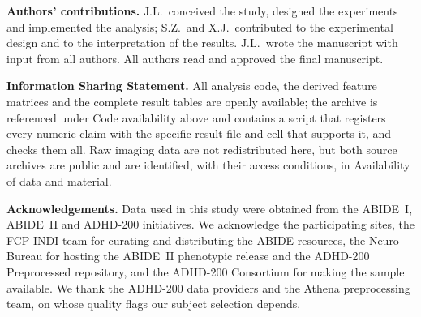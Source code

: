 \documentclass[11pt,a4paper]{article}
\begin{document}
\medskip
\noindent\textbf{Authors' contributions.} \quad J.L.\ conceived the study,
designed the experiments and implemented the analysis; S.Z.\ and X.J.\
contributed to the experimental design and to the interpretation of the
results. J.L.\ wrote the manuscript with input from all authors. All
authors read and approved the final manuscript.

\medskip
\noindent\textbf{Information Sharing Statement.}  \quad
All analysis code, the derived feature matrices and the complete result
tables are openly available; the archive is referenced under Code
availability above and contains a script that registers every numeric claim
with the specific result file and cell that supports it, and checks them all.
Raw imaging data are not redistributed here, but both source archives are
public and are identified, with their access conditions, in Availability of
data and material.

\medskip
\noindent\textbf{Acknowledgements.} \quad Data used in this study were
obtained from the ABIDE~I, ABIDE~II and ADHD-200 initiatives. We acknowledge
the participating sites, the FCP-INDI team for curating and distributing the
ABIDE resources, the Neuro Bureau for hosting the ABIDE~II phenotypic
release and the ADHD-200 Preprocessed repository, and the ADHD-200 Consortium
for making the sample available. We thank the ADHD-200 data providers and
the Athena preprocessing team, on whose quality flags our subject selection
depends.
\end{document}
